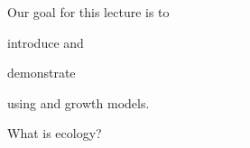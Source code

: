 \documentclass[t,handout]{beamer}  %
\begin{document}

\begin{frame}{Our goal for this lecture is to }

	
	\hangpara introduce  and
	
	\hangpara demonstrate 
	
	\hangpara using  and  growth models.

\end{frame}
%
%
%
%
%
{
\begin{frame}[b]{\hfill What is ecology?}
	\tiny\textcolor{white}{Jeff Taylor, Wikimedia, .}%
\end{frame}
}
\end{document}
